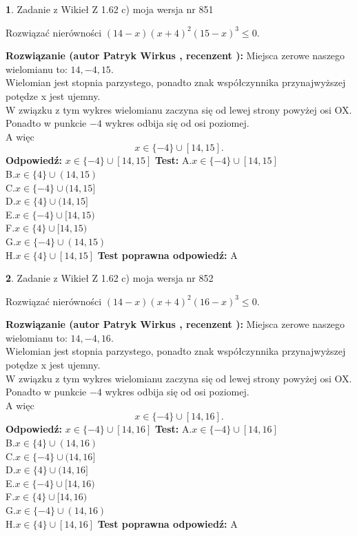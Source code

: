 \documentclass[12pt, a4paper]{article}
\theoremstyle{definition} %
\newtheorem{zad}{}
\newcommand{\zadStart}[1]{\begin{zad}#1\newline}
\newcommand{\zadStop}{\end{zad}}
\newcommand{\rozwStart}[2]{\noindent \textbf{Rozwiązanie (autor #1 , recenzent #2): }\newline}
\newcommand{\rozwStop}{\newline}
\newcommand{\odpStart}{\noindent \textbf{Odpowiedź:}\newline}
\newcommand{\odpStop}{\newline}
\newcommand{\testStart}{\noindent \textbf{Test:}\newline}
\newcommand{\testStop}{\newline}
\newcommand{\kluczStart}{\noindent \textbf{Test poprawna odpowiedź:}\newline}
\newcommand{\kluczStop}{\newline}
\begin{document}
\zadStart{Zadanie z Wikieł Z 1.62 c) moja wersja nr 851}

Rozwiązać nierówności $(14-x)(x+4)^{2}(15-x)^{3}\le0$.
\zadStop
\rozwStart{Patryk Wirkus}{}
Miejsca zerowe naszego wielomianu to: $14, -4, 15$.\\
Wielomian jest stopnia parzystego, ponadto znak współczynnika przy\linebreak najwyższej potędze x jest ujemny.\\ W związku z tym wykres wielomianu zaczyna się od lewej strony powyżej osi OX.\\
Ponadto w punkcie $-4$ wykres odbija się od osi poziomej.\\
A więc $$x \in \{-4\} \cup [14,15].$$
\rozwStop
\odpStart
$x \in \{-4\} \cup [14,15]$
\odpStop
\testStart
A.$x \in \{-4\} \cup [14,15]$\\
B.$x \in \{4\} \cup (14,15)$\\
C.$x \in \{-4\} \cup (14,15]$\\
D.$x \in \{4\} \cup (14,15]$\\
E.$x \in \{-4\} \cup [14,15)$\\
F.$x \in \{4\} \cup [14,15)$\\
G.$x \in \{-4\} \cup (14,15)$\\
H.$x \in \{4\} \cup [14,15]$
\testStop
\kluczStart
A
\kluczStop



\zadStart{Zadanie z Wikieł Z 1.62 c) moja wersja nr 852}

Rozwiązać nierówności $(14-x)(x+4)^{2}(16-x)^{3}\le0$.
\zadStop
\rozwStart{Patryk Wirkus}{}
Miejsca zerowe naszego wielomianu to: $14, -4, 16$.\\
Wielomian jest stopnia parzystego, ponadto znak współczynnika przy\linebreak najwyższej potędze x jest ujemny.\\ W związku z tym wykres wielomianu zaczyna się od lewej strony powyżej osi OX.\\
Ponadto w punkcie $-4$ wykres odbija się od osi poziomej.\\
A więc $$x \in \{-4\} \cup [14,16].$$
\rozwStop
\odpStart
$x \in \{-4\} \cup [14,16]$
\odpStop
\testStart
A.$x \in \{-4\} \cup [14,16]$\\
B.$x \in \{4\} \cup (14,16)$\\
C.$x \in \{-4\} \cup (14,16]$\\
D.$x \in \{4\} \cup (14,16]$\\
E.$x \in \{-4\} \cup [14,16)$\\
F.$x \in \{4\} \cup [14,16)$\\
G.$x \in \{-4\} \cup (14,16)$\\
H.$x \in \{4\} \cup [14,16]$
\testStop
\kluczStart
A
\kluczStop
\end{document}
